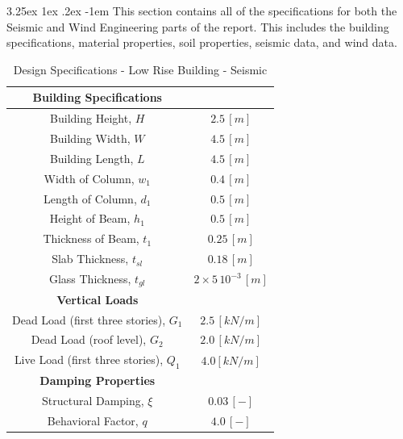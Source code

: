 \documentclass[11pt,a4paper,titlepage]{report}
\makeatletter
\renewcommand\paragraph{\@startsection{paragraph}{5}{\z@}%
  {3.25ex \@plus1ex \@minus.2ex}%
  {-1em}%
  {\normalfont\normalsize\bfseries}}
\makeatother
\begin{document}
\paragraph{}This section contains all of the specifications for both the Seismic and Wind Engineering parts of the report. This includes the building specifications, material properties, soil properties, seismic data, and wind data. 
\begin{table}[h!]
  \begin{center}
    \begin{tabular}{c|c}
    \hline
      \textbf{Building Specifications}\\
      \hline
      Building Height, $H$ & $2.5\,[m]$\\
      Building Width, $W$ & $4.5\,[m]$\\
      Building Length, $L$ & $4.5\,[m]$\\
      Width of Column, $w_1$ & $0.4\,[m]$\\
      Length of Column, $d_1$ & $0.5\,[m]$\\
      Height of Beam, $h_{1}$ & $0.5\,[m]$\\
      Thickness of Beam, $t_{1}$ & $0.25\,[m]$\\
      Slab Thickness, $t_{sl}$ & $0.18\,[m]$\\
      Glass Thickness, $t_{gl}$ & $2\times5\,10^{-3}\,[m]$\\
      \hline
      \textbf{Vertical Loads}\\
      \hline
      Dead Load (first three stories), $G_1$ & $2.5\,[kN/m]$\\
      Dead Load (roof level), $G_2$ & $2.0\,[kN/m]$\\
      Live Load (first three stories), $Q_1$ & $4.0[kN/m]$\\
       \hline
       \textbf{Damping Properties}\\
         \hline
      Structural Damping, $\xi $ & $0.03\,[-]$\\
      Behavioral Factor, $q$ & $4.0\,[-]$ \\
       \end{tabular}
       \caption{Design Specifications - Low Rise Building - Seismic}
    \label{tab: Specifications - Design LowRB }
  \end{center}
\end{table}
\end{document}
